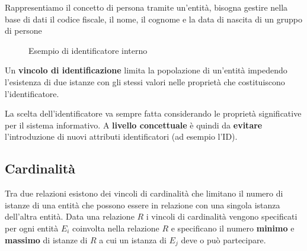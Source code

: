 \documentclass[a4paper,twoside]{article}
\begin{document}
\begin{example}
  Rappresentiamo il concetto di persona tramite un'entità, bisogna gestire nella base
  di dati il codice fiscale, il nome, il cognome e la data di nascita di un gruppo
  di persone
  \begin{figure}[H]
    \centering
    \caption{Esempio di identificatore interno}
  \end{figure}
\end{example}

\begin{definition}
  Un \textbf{vincolo di identificazione} limita la popolazione di un'entità impedendo
  l'esistenza di due istanze con gli stessi valori nelle proprietà che costituiscono
  l'identificatore.

  \vspace{1em}
  \noindent
  La scelta dell'identificatore va sempre fatta considerando le proprietà significative
  per il sistema informativo. A \textbf{livello concettuale} è quindi da \textbf{evitare}
  l'introduzione di nuovi attributi identificatori (ad esempio l'ID).
\end{definition}

\subsection{Cardinalità}\label{Cardinalità}
Tra due relazioni esistono dei vincoli di cardinalità che limitano il numero di istanze
di una entità che possono essere in relazione con una singola istanza dell'altra entità.
Data una relazione \( R \) i vincoli di cardinalità vengono specificati per ogni entità
\( E_i \) coinvolta nella relazione \( R \) e specificano il numero \textbf{minimo} e
\textbf{massimo} di istanze di \( R \) a cui un istanza di \( E_j \) deve o può 
partecipare.
\end{document}
